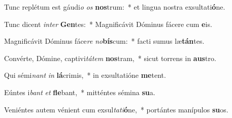 \item Tunc replétum est gáudi\textit{o} \textit{os} \textbf{nos}trum:~* et lingua nostra exsultati\textbf{ó}ne.
\item Tunc dicent \textit{in}\textit{ter} \textbf{Gen}tes:~* Magnificávit Dóminus fácere cum \textbf{e}is.
\item Magnificávit Dóminus fáce\textit{re} \textit{no}\textbf{bís}cum:~* facti sumus læ\textbf{tán}tes.
\item Convérte, Dómine, captivi\textit{tá}\textit{tem} \textbf{nos}tram,~* sicut torrens in \textbf{aus}tro.
\item Qui sémi\textit{nant} \textit{in} \textbf{lá}crimis,~* in exsultatióne \textbf{me}tent.
\item Eúntes i\textit{bant} \textit{et} \textbf{fle}bant,~* mitténtes sémina \textbf{su}a.
\item Veniéntes autem vénient cum exsul\textit{ta}\textit{ti}\textbf{ó}ne,~* portántes manípulos \textbf{su}os.
